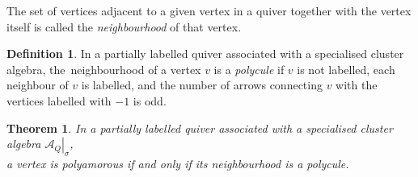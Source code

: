 \documentclass[12pt]{article}
\newtheorem{theorem}{Theorem}
\theoremstyle{definition}
\newtheorem{definition}{Definition}
\newcommand{\sA}{\left.\mathcal{A}_Q\right|_\sigma}
\begin{document}
The set of vertices adjacent to a given vertex in a quiver together with the vertex itself is called the \emph{neighbourhood} of that vertex.
\begin{definition}
\label{def:polycule}
In a partially labelled quiver associated with a specialised cluster algebra, the~neighbourhood of a vertex $v$ is a \emph{polycule} if $v$ is not labelled, each neighbour of $v$ is labelled, and the number of arrows connecting $v$ with the vertices labelled with $-1$ is odd.
\end{definition}

\begin{theorem}
\label{thm:poly:main}
In a partially labelled quiver associated with a specialised cluster algebra $\sA$, \\ a vertex is polyamorous if and only if its neighbourhood is a polycule.
\end{theorem}
\end{document}
